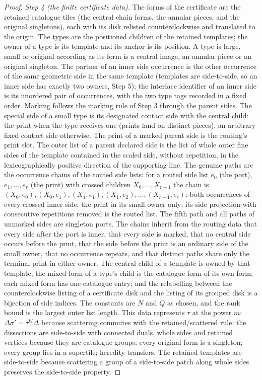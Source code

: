 \begin{proof}
\emph{Step 4 (the finite certificate data).}  The forms of the certificate
are the retained catalogue tiles (the central chain forms, the annular
pieces, and the original singletons), each with its disk relisted
counterclockwise and translated to the origin.  The types are the positioned
children of the retained templates; the owner of a type is its template and
its anchor is its position.  A type is large, small or original according as
its form is a central image, an annular piece or an original singleton.  The
partner of an inner side occurrence is the other occurrence of the same
geometric side in the same template (templates are side-to-side, so an inner
side has exactly two owners, Step 5); the interface identifier of an inner
side is its unordered pair of occurrences, with the two type tags recorded in
a fixed order.  Marking follows the marking rule of Step 3 through the parent
sides.  The special side of a small type is its designated contact side with
the central child: the print when the type receives one (prints land on
distinct pieces), an arbitrary fixed contact side otherwise.  The print of a
marked parent side is the routing's print slot.  The outer list of a parent
declared side is the list of whole outer fine sides of the template contained
in the scaled side, without repetition, in the lexicographically positive
direction of the supporting line.  The genuine paths are the occurrence
chains of the routed side lists: for a routed side list $e_0$ (the port),
$e_1,\dots,e_r$ (the print) with crossed children $X_0,\dots,X_{r-1}$ the
chain is $(X_0,e_0),(X_0,e_1),(X_1,e_1),(X_1,e_2),\dots,(X_{r-1},e_r)$: both
occurrences of every crossed inner side, the print in its small owner only;
its side projection with consecutive repetitions removed is the routed list.
The fifth path and all paths of unmarked sides are singleton ports.  The
chains inherit from the routing data that every side after the port is
inner, that every side is marked, that no central side occurs before the
print, that the side before the print is an ordinary side of the small
owner, that no occurrence repeats, and that distinct paths share only the
terminal print in either owner.  The central child of a template is owned
by that template; the mixed form of a type's child is the catalogue form of
its own form; each mixed form has one catalogue entry; and the relabelling
between the counterclockwise listing of a certificate disk and the listing
of its grouped disk is a bijection of side indices.  The
constants are $N$ and $Q$ as chosen, and the rank bound is the largest outer
list length.  This data represents $\tau$ at the power $m$: $\Delta\sigma'=
\tau^{kl}\Delta$ because scattering commutes with the retained/scattered rule;
the dissections are side-to-side with connected duals, whole sides and
retained vertices because they are catalogue groups; every original form is a
singleton; every group lies in a supertile; heredity transfers.  The retained
templates are side-to-side because scattering a group of a side-to-side patch
along whole sides preserves the side-to-side property.


\end{proof}
